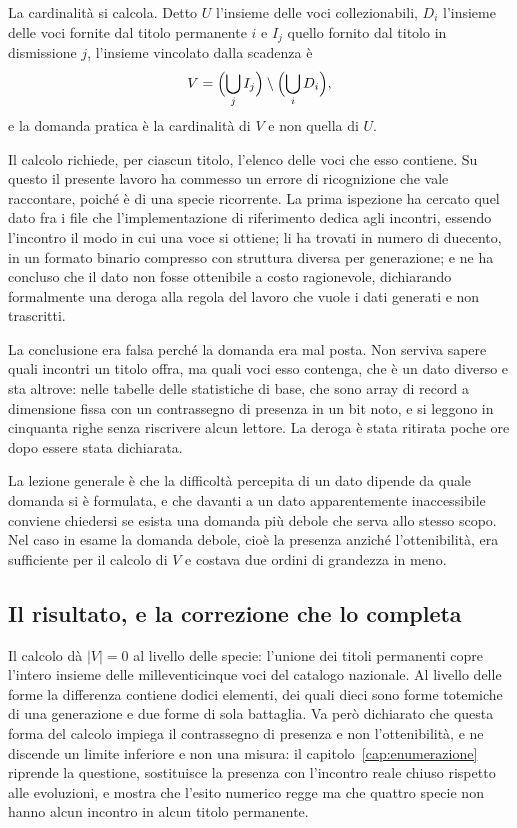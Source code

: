 La cardinalità si calcola. Detto $U$ l'insieme delle voci collezionabili, $D_i$ l'insieme delle voci fornite dal titolo permanente $i$ e $I_j$ quello fornito dal titolo in dismissione $j$, l'insieme vincolato dalla scadenza è
\begin{equation}
V = \Bigl(\bigcup_j I_j\Bigr) \setminus \Bigl(\bigcup_i D_i\Bigr) ,
\end{equation}
e la domanda pratica è la cardinalità di $V$ e non quella di $U$.

Il calcolo richiede, per ciascun titolo, l'elenco delle voci che esso contiene. Su questo il presente lavoro ha commesso un errore di ricognizione che vale raccontare, poiché è di una specie ricorrente. La prima ispezione ha cercato quel dato fra i file che l'implementazione di riferimento dedica agli incontri, essendo l'incontro il modo in cui una voce si ottiene; li ha trovati in numero di duecento, in un formato binario compresso con struttura diversa per generazione; e ne ha concluso che il dato non fosse ottenibile a costo ragionevole, dichiarando formalmente una deroga alla regola del lavoro che vuole i dati generati e non trascritti.

La conclusione era falsa perché la domanda era mal posta. Non serviva sapere quali incontri un titolo offra, ma quali voci esso contenga, che è un dato diverso e sta altrove: nelle tabelle delle statistiche di base, che sono array di record a dimensione fissa con un contrassegno di presenza in un bit noto, e si leggono in cinquanta righe senza riscrivere alcun lettore. La deroga è stata ritirata poche ore dopo essere stata dichiarata.

La lezione generale è che la difficoltà percepita di un dato dipende da quale domanda si è formulata, e che davanti a un dato apparentemente inaccessibile conviene chiedersi se esista una domanda più debole che serva allo stesso scopo. Nel caso in esame la domanda debole, cioè la presenza anziché l'ottenibilità, era sufficiente per il calcolo di $V$ e costava due ordini di grandezza in meno.

\subsection*{Il risultato, e la correzione che lo completa}

Il calcolo dà $|V| = 0$ al livello delle specie: l'unione dei titoli permanenti copre l'intero insieme delle milleventicinque voci del catalogo nazionale. Al livello delle forme la differenza contiene dodici elementi, dei quali dieci sono forme totemiche di una generazione e due forme di sola battaglia. Va però dichiarato che questa forma del calcolo impiega il contrassegno di presenza e non l'ottenibilità, e ne discende un limite inferiore e non una misura: il capitolo~\ref{cap:enumerazione} riprende la questione, sostituisce la presenza con l'incontro reale chiuso rispetto alle evoluzioni, e mostra che l'esito numerico regge ma che quattro specie non hanno alcun incontro in alcun titolo permanente.

